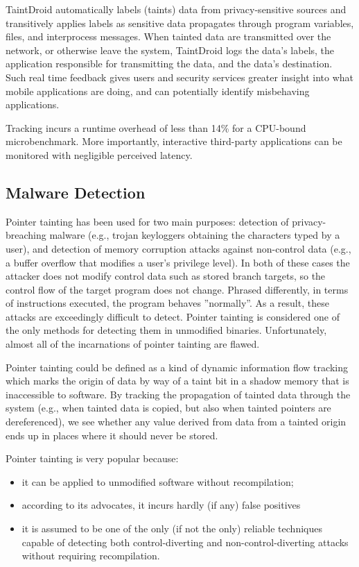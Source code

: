 TaintDroid automatically labels (taints) data from privacy-sensitive sources and transitively applies labels as sensitive data propagates through program variables, files, and interprocess messages. When tainted data are transmitted over the network, or otherwise leave the system, TaintDroid logs the data’s labels, the application responsible for transmitting the data, and the data’s destination. Such real time feedback gives users and security services greater insight into what mobile applications are doing, and can potentially identify misbehaving applications. 

Tracking incurs a runtime overhead of less than 14\% for a CPU-bound microbenchmark. More importantly, interactive third-party applications can be monitored with negligible perceived latency.

\subsection{Malware Detection}
Pointer tainting has been used for two main purposes: detection of privacy-breaching malware (e.g., trojan keyloggers obtaining the characters typed by a user), and detection of memory corruption attacks against non-control data (e.g., a buffer overflow that modifies a user’s privilege level). In both of these cases the attacker does not modify control data such as stored branch targets, so the control flow of the target program does not change. Phrased differently, in terms of instructions executed, the program behaves ''normally''. As a result, these attacks are exceedingly difficult to detect. Pointer tainting is considered one of the only methods for detecting them in unmodified binaries. Unfortunately, almost all of the incarnations of pointer tainting are flawed.

Pointer tainting could be defined as a kind of dynamic information flow tracking which marks the origin of data by way of a taint bit in a shadow memory that is inaccessible to software. By tracking the propagation of tainted data through the system (e.g., when tainted data is copied, but also when tainted pointers are dereferenced), we see whether any value derived from data from a tainted origin ends up in places where it should never be stored.

Pointer tainting is very popular because:
\begin{itemize}
	\item it can be applied to unmodified software without recompilation;
	\item according to its advocates, it incurs hardly (if any) false positives
	\item it is assumed to be one of the only (if not the only) reliable techniques capable of detecting both control-diverting and non-control-diverting attacks without requiring recompilation.
\end{itemize}

